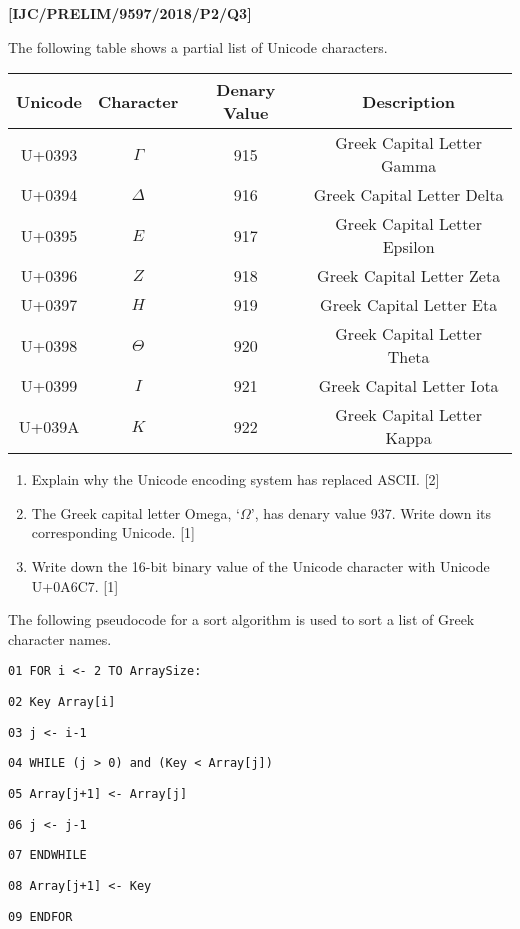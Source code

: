 \item \textbf{{[}IJC/PRELIM/9597/2018/P2/Q3{]} }

The following table shows a partial list of Unicode characters. 
\begin{center}
\begin{tabular}{|c|c|c|c|}
\hline 
Unicode & Character & Denary Value & Description\tabularnewline
\hline 
U+0393 & $\Gamma$ & 915 & Greek Capital Letter Gamma\tabularnewline
\hline 
U+0394 & $\Delta$ & 916 & Greek Capital Letter Delta\tabularnewline
\hline 
U+0395 & $E$ & 917 & Greek Capital Letter Epsilon\tabularnewline
\hline 
U+0396 & $Z$ & 918 & Greek Capital Letter Zeta\tabularnewline
\hline 
U+0397 & $H$ & 919 & Greek Capital Letter Eta\tabularnewline
\hline 
U+0398 & $\Theta$ & 920 & Greek Capital Letter Theta\tabularnewline
\hline 
U+0399 & $I$ & 921 & Greek Capital Letter Iota\tabularnewline
\hline 
U+039A & $K$ & 922 & Greek Capital Letter Kappa\tabularnewline
\hline 
\end{tabular}
\par\end{center}
\begin{enumerate}
\item Explain why the Unicode encoding system has replaced ASCII.\hfill{}
{[}2{]}
\item The Greek capital letter Omega, \textquoteleft $\Omega$\textquoteright ,
has denary value 937. Write down its corresponding Unicode.\hfill{}
{[}1{]}
\item Write down the 16-bit binary value of the Unicode character with Unicode
U+0A6C7. \hfill{}{[}1{]}
\end{enumerate}
The following pseudocode for a sort algorithm is used to sort a list
of Greek character names.

\noindent\begin{minipage}[t]{1\columnwidth}%
\texttt{01 FOR i <- 2 TO ArraySize: }

\texttt{02 \qquad{}Key Array{[}i{]} }

\texttt{03 \qquad{}j <- i-1 }

\texttt{04 \qquad{}WHILE (j > 0) and (Key < Array{[}j{]}) }

\texttt{05 \qquad{}\qquad{}Array{[}j+1{]} <- Array{[}j{]}}

\texttt{06 \qquad{}\qquad{}j <- j-1}

\texttt{07 \qquad{}ENDWHILE}

\texttt{08 \qquad{}Array{[}j+1{]} <- Key}

\texttt{09 ENDFOR}%
\end{minipage}

